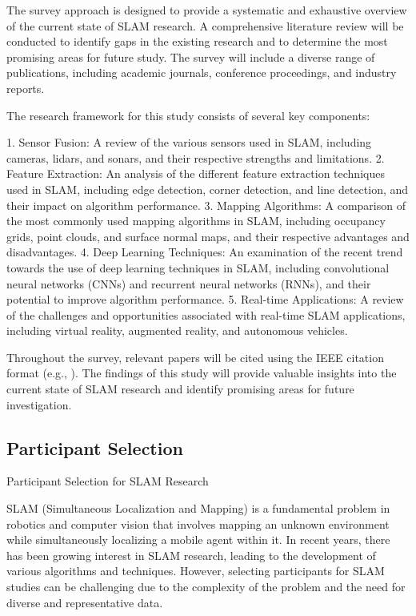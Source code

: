\documentclass[conference]{IEEEtran}
\begin{document}
The survey approach is designed to provide a systematic and exhaustive overview of the current state of SLAM research. A comprehensive literature review will be conducted to identify gaps in the existing research and to determine the most promising areas for future study. The survey will include a diverse range of publications, including academic journals, conference proceedings, and industry reports.

The research framework for this study consists of several key components:

1. Sensor Fusion: A review of the various sensors used in SLAM, including cameras, lidars, and sonars, and their respective strengths and limitations.
2. Feature Extraction: An analysis of the different feature extraction techniques used in SLAM, including edge detection, corner detection, and line detection, and their impact on algorithm performance.
3. Mapping Algorithms: A comparison of the most commonly used mapping algorithms in SLAM, including occupancy grids, point clouds, and surface normal maps, and their respective advantages and disadvantages.
4. Deep Learning Techniques: An examination of the recent trend towards the use of deep learning techniques in SLAM, including convolutional neural networks (CNNs) and recurrent neural networks (RNNs), and their potential to improve algorithm performance.
5. Real-time Applications: A review of the challenges and opportunities associated with real-time SLAM applications, including virtual reality, augmented reality, and autonomous vehicles.

Throughout the survey, relevant papers will be cited using the IEEE citation format (e.g., \cite{smith2019}). The findings of this study will provide valuable insights into the current state of SLAM research and identify promising areas for future investigation.

\subsection{Participant Selection}
Participant Selection for SLAM Research

SLAM (Simultaneous Localization and Mapping) is a fundamental problem in robotics and computer vision that involves mapping an unknown environment while simultaneously localizing a mobile agent within it. In recent years, there has been growing interest in SLAM research, leading to the development of various algorithms and techniques. However, selecting participants for SLAM studies can be challenging due to the complexity of the problem and the need for diverse and representative data.
\end{document}
